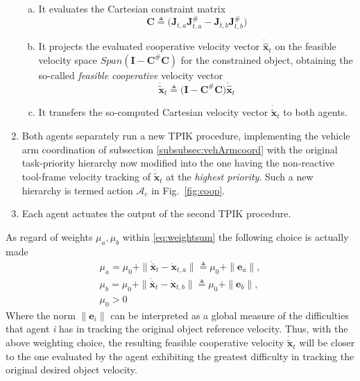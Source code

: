 \documentclass[a4paper, 12pt, notitlepage]{article}
\begin{document}
\begin{multicols}{2}
\begin{enumerate}[leftmargin=*]
\begin{enumerate}[a), leftmargin=*]
				\item It evaluates the Cartesian constraint matrix
				\begin{equation}
					\boldsymbol{C} \triangleq \Big( \boldsymbol{J}_{t,a} \boldsymbol{J}^\#_{t,a} - \boldsymbol{J}_{t,b} \boldsymbol{J}^\#_{t,b} \Big)	
				\end{equation}
				
				\item It projects the evaluated cooperative velocity vector $\dot{\hat{\boldsymbol{x}}}_t$
				on the feasible velocity space $Span(\boldsymbol{I} − \boldsymbol{C}^\# \boldsymbol{C})$ for the constrained object, obtaining the so-called \textit{feasible cooperative} velocity vector
				\begin{equation}
					\dot{\tilde{\boldsymbol{x}}}_t \triangleq \big( \boldsymbol{I} − \boldsymbol{C}^\# \boldsymbol{C} \big) \dot{\hat{\boldsymbol{x}}}_t
				\end{equation}
				
				\item It transfers the so-computed Cartesian velocity vector
				$\dot{\tilde{\boldsymbol{x}}}_t$ to both agents.			
			\end{enumerate}
			
			\item Both agents separately run a new TPIK procedure, implementing the vehicle arm coordination of subsection \ref{subsubsec:vehArmcoord} with the original task-priority hierarchy now modified into the one having the non-reactive tool-frame velocity tracking of $\dot{\tilde{\boldsymbol{x}}}_t$ at the \textit{highest priority}.
			Such a new hierarchy is termed action $\mathcal{A}_c$ in Fig.\ \ref{fig:coop}.
			
			\item Each agent actuates the output of the second TPIK
			procedure.
					
		\end{enumerate}
		
		As regard of weights $\mu_a, \mu_b$ within \eqref{eq:weightsum} the following choice is actually made
		\begin{equation}
			\begin{gathered}
			\mu_a = \mu_0 + \| \dot{\bar{\boldsymbol{x}}}_t - \dot{\boldsymbol{x}}_{t,a} \| \triangleq \mu_0 + \| \boldsymbol{e}_a \|, \\
			\mu_b = \mu_0 + \| \dot{\bar{\boldsymbol{x}}}_t - \dot{\boldsymbol{x}}_{t,b} \| \triangleq \mu_0 + \| \boldsymbol{e}_b \|, \\
			\mu_0 > 0
			\end{gathered}
		\end{equation}
		Where the norm $\| \boldsymbol{e}_i \|$ can be interpreted as a global measure of the difficulties that agent \textit{i} has in tracking the original object reference velocity. Thus, with the above weighting choice, the resulting feasible cooperative velocity $\dot{\tilde{\boldsymbol{x}}}_t$ will be closer to the one evaluated by the agent exhibiting the greatest difficulty in tracking the original desired object velocity.
		

\end{multicols}
\end{document}
